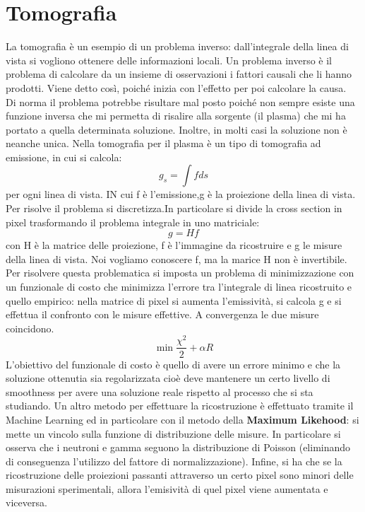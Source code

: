 \documentclass{article}
\begin{document}
\section{Tomografia}
La tomografia è un esempio di un problema inverso: dall'integrale della linea di vista si vogliono ottenere delle informazioni locali. Un problema inverso è il problema di calcolare da un insieme di osservazioni i fattori causali che li hanno prodotti. Viene detto così, poiché inizia con l'effetto per poi calcolare la causa.\\
Di norma il problema potrebbe risultare mal posto poiché non sempre esiste una funzione inversa che mi permetta di risalire alla sorgente (il plasma) che mi ha portato a quella determinata soluzione. Inoltre, in molti casi la soluzione non è neanche unica.\newline
Nella tomografia per il plasma è un tipo di tomografia ad emissione, in cui si calcola:\begin{equation*}
    g_{s}=\int f ds
\end{equation*}
per ogni linea di vista. IN cui f è l'emissione,g è la proiezione della linea di vista.\newline
Per risolve il problema si discretizza.In particolare si divide la cross section in pixel trasformando il problema integrale in uno matriciale:\begin{equation*}
    g=Hf
\end{equation*}
con H è la matrice delle proiezione, f è l'immagine da ricostruire e g le misure della linea di vista. Noi vogliamo conoscere f, ma la marice H non è invertibile. Per risolvere questa problematica si imposta un problema di minimizzazione con un funzionale di costo che minimizza l'errore tra l'integrale di linea ricostruito e quello empirico: nella matrice di pixel si aumenta l'emissività, si calcola g e si effettua il confronto con le misure effettive. A convergenza le due misure coincidono.
\begin{equation*}
    \min{\frac{\chi^{2}}{2}+\alpha R}
\end{equation*}
L'obiettivo del funzionale di costo è quello di avere un errore minimo e che la soluzione ottenutia sia regolarizzata cioè deve mantenere un certo livello di smoothness per avere una soluzione reale rispetto al processo che si sta studiando. Un altro metodo per effettuare la ricostruzione è effettuato tramite il Machine Learning ed in particolare con il metodo della \textbf{Maximum Likehood}: si mette un vincolo sulla funzione di distribuzione delle misure. In particolare si osserva che i neutroni e gamma seguono la distribuzione di Poisson (eliminando di conseguenza l'utilizzo del fattore di normalizzazione). Infine, si ha che se la ricostruzione delle proiezioni passanti attraverso un certo pixel sono minori delle misurazioni sperimentali, allora l'emisività di quel pixel viene aumentata e viceversa.\newline
\end{document}
